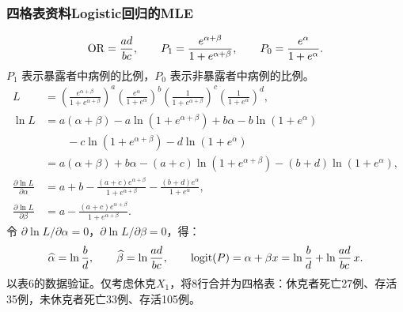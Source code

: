 \subsubsection{四格表资料Logistic回归的MLE}
\[
\operatorname{OR}=\frac{ad}{bc},\qquad P_1=\frac{e^{\alpha+\beta}}{1+e^{\alpha+\beta}},\qquad P_0=\frac{e^\alpha}{1+e^\alpha}.
\]
$P_1$ 表示暴露者中病例的比例，$P_0$ 表示非暴露者中病例的比例。
\begin{align*}
L&=\left(\frac{e^{\alpha+\beta}}{1+e^{\alpha+\beta}}\right)^a
\left(\frac{e^\alpha}{1+e^\alpha}\right)^b
\left(\frac1{1+e^{\alpha+\beta}}\right)^c
\left(\frac1{1+e^\alpha}\right)^d,\\
\ln L&=a(\alpha+\beta)-a\ln(1+e^{\alpha+\beta})+b\alpha-b\ln(1+e^\alpha)\\
&\qquad-c\ln(1+e^{\alpha+\beta})-d\ln(1+e^\alpha)\\
&=a(\alpha+\beta)+b\alpha-(a+c)\ln(1+e^{\alpha+\beta})-(b+d)\ln(1+e^\alpha),\\
\frac{\partial\ln L}{\partial\alpha}&=a+b-\frac{(a+c)e^{\alpha+\beta}}{1+e^{\alpha+\beta}}-\frac{(b+d)e^\alpha}{1+e^\alpha},\\
\frac{\partial\ln L}{\partial\beta}&=a-\frac{(a+c)e^{\alpha+\beta}}{1+e^{\alpha+\beta}}.
\end{align*}
令 $\partial\ln L/\partial\alpha=0$，$\partial\ln L/\partial\beta=0$，得：
\[
\widehat\alpha=\ln\frac bd,\qquad \widehat\beta=\ln\frac{ad}{bc},\qquad
\operatorname{logit}(P)=\alpha+\beta x=\ln\frac bd+\ln\frac{ad}{bc}\,x.
\]
以表6的数据验证。仅考虑休克$X_1$，将8行合并为四格表：休克者死亡27例、存活35例，未休克者死亡33例、存活105例。
